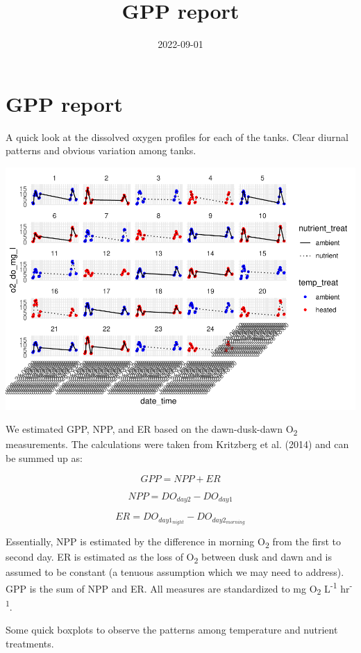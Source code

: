 \documentclass[
]{article}
\title{GPP report}
\author{}
\date{\vspace{-2.5em}2022-09-01}
\begin{document}
\maketitle

\hypertarget{gpp-report}{%
\section{GPP report}\label{gpp-report}}

A quick look at the dissolved oxygen profiles for each of the tanks.
Clear diurnal patterns and obvious variation among tanks.

\includegraphics{GPP-report_files/figure-latex/DO profiles-1.pdf}

We estimated GPP, NPP, and ER based on the dawn-dusk-dawn
O\textsubscript{2} measurements. The calculations were taken from
Kritzberg et al. (2014) and can be summed up as:

\[ GPP = NPP + ER \]

\[ NPP = DO_{day2} - DO_{day1} \]

\[ ER = DO_{day1_{night}} - DO_{day2_{morning}} \]

Essentially, NPP is estimated by the difference in morning
O\textsubscript{2} from the first to second day. ER is estimated as the
loss of O\textsubscript{2} between dusk and dawn and is assumed to be
constant (a tenuous assumption which we may need to address). GPP is the
sum of NPP and ER. All measures are standardized to mg
O\textsubscript{2} L\textsuperscript{-1} hr\textsuperscript{-1}.

Some quick boxplots to observe the patterns among temperature and
nutrient treatments.
\end{document}
